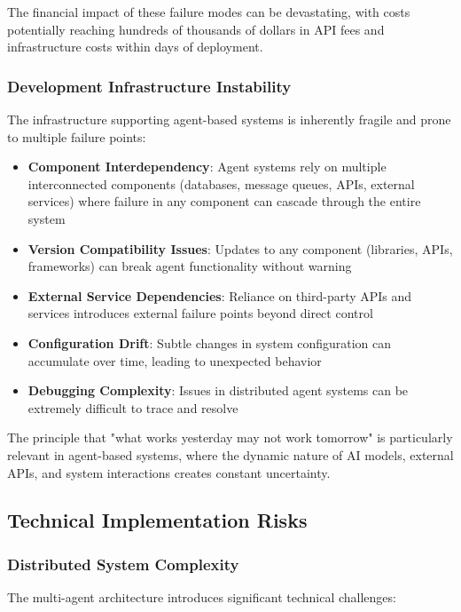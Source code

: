 The financial impact of these failure modes can be devastating, with costs potentially reaching hundreds of thousands of dollars in API fees and infrastructure costs within days of deployment.

\subsubsection{Development Infrastructure Instability}

The infrastructure supporting agent-based systems is inherently fragile and prone to multiple failure points:

\begin{itemize}
    \item \textbf{Component Interdependency}: Agent systems rely on multiple interconnected components (databases, message queues, APIs, external services) where failure in any component can cascade through the entire system
    \item \textbf{Version Compatibility Issues}: Updates to any component (libraries, APIs, frameworks) can break agent functionality without warning
    \item \textbf{External Service Dependencies}: Reliance on third-party APIs and services introduces external failure points beyond direct control
    \item \textbf{Configuration Drift}: Subtle changes in system configuration can accumulate over time, leading to unexpected behavior
    \item \textbf{Debugging Complexity}: Issues in distributed agent systems can be extremely difficult to trace and resolve
\end{itemize}

The principle that "what works yesterday may not work tomorrow" is particularly relevant in agent-based systems, where the dynamic nature of AI models, external APIs, and system interactions creates constant uncertainty.

\subsection{Technical Implementation Risks}

\subsubsection{Distributed System Complexity}

The multi-agent architecture introduces significant technical challenges:

